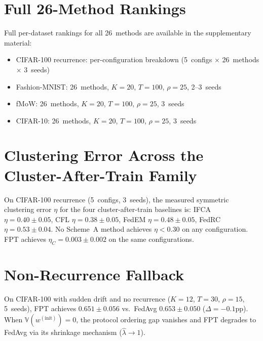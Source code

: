 \documentclass[11pt]{article}
\newcommand{\V}{\mathbb{V}}
\begin{document}
\section{Full 26-Method Rankings}
\label{app:full_rankings}

Full per-dataset rankings for all 26~methods are available in the supplementary material:
\begin{itemize}[leftmargin=*,topsep=2pt,itemsep=1pt]
    \item CIFAR-100 recurrence: per-configuration breakdown (5~configs $\times$ 26~methods $\times$ 3~seeds)
    \item Fashion-MNIST: 26~methods, $K{=}20$, $T{=}100$, $\rho{=}25$, 2--3~seeds
    \item fMoW: 26~methods, $K{=}20$, $T{=}100$, $\rho{=}25$, 3~seeds
    \item CIFAR-10: 26~methods, $K{=}20$, $T{=}100$, $\rho{=}25$, 3~seeds
\end{itemize}

\section{Clustering Error Across the Cluster-After-Train Family}
\label{app:eta_full}

On CIFAR-100 recurrence (5~configs, 3~seeds), the measured symmetric clustering error $\eta$ for the four cluster-after-train baselines is:
IFCA $\eta = 0.40 \pm 0.05$,
CFL $\eta = 0.38 \pm 0.05$,
FedEM $\eta = 0.48 \pm 0.05$,
FedRC $\eta = 0.53 \pm 0.04$.
No Scheme~A method achieves $\eta < 0.30$ on any configuration.
FPT achieves $\eta_C = 0.003 \pm 0.002$ on the same configurations.


\section{Non-Recurrence Fallback}
\label{app:nonrecurrence}

On CIFAR-100 with sudden drift and no recurrence ($K{=}12$, $T{=}30$, $\rho{=}15$, 5~seeds), FPT achieves $0.651 \pm 0.056$ vs.\ FedAvg $0.653 \pm 0.050$ ($\Delta = -0.1$pp).
When $\V(w^{(\mathrm{init})}) = 0$, the protocol ordering gap vanishes and FPT degrades to FedAvg via its shrinkage mechanism ($\hat\lambda \to 1$).
\end{document}
